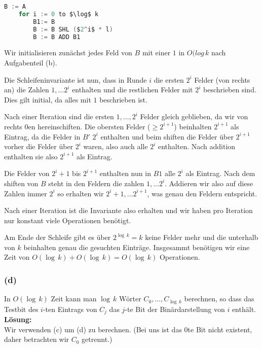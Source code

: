 \documentclass[11pt,a4paper,ngerman]{article}
\begin{document}
\begin{lstlisting}[frame=single, language=C, morekeywords={:=,SHR,SHL,NOT,XOR,AND,OR,MUL}]
	B := A
	for i := 0 to $\log$ k
		B1:= B
		B := B SHL ($2^i$ * l)
		B := B ADD B1
\end{lstlisting}

Wir initialisieren zunächst jedes Feld von $B$ mit einer $1$ in $O(log \, k$ nach Aufgabenteil (b).

Die Schleifeninvariante ist nun, dass in Runde $i$ die ersten $2^i$ Felder (von rechts an) die Zahlen $1, \ldots 2^i$ enthalten und
die restlichen Felder mit $2^i$ beschrieben sind. Dies gilt initial, da alles mit $1$ beschrieben ist.

Nach einer Iteration sind die ersten $1, \ldots, 2^i$ Felder gleich geblieben, da wir von rechts $0$en hereinschiften. Die obersten Felder ($\geq 2^{i+1}$) beinhalten $2^{i+1}$ als Eintrag, da die Felder in $B'$ $2^i$ enthalten und beim shiften die Felder über $2^{i+1}$ vorher die Felder
über $2^i$ waren, also auch alle $2^i$ enthalten. Nach addition enthalten sie also $2^{i+1}$ als Eintrag.

Die Felder von $2^i+1$ bis $2^{i+1}$ enthalten nun in $B1$ alle $2^i$ als Eintrag. Nach dem shiften von $B$ steht in den Feldern die zahlen
$1, \ldots 2^i$. Addieren wir also auf diese Zahlen immer $2^i$ so erhalten wir $2^i+1,\ldots 2^{i+1}$, was genau den Feldern entspricht.

Nach einer Iteration ist die Invariante also erhalten und wir haben pro Iteration nur konstant viele Operationen benötigt.

Am Ende der Schleife gibt es über $2^{\log \, k} = k$ keine Felder mehr und die unterhalb von $k$ beinhalten genau die gesuchten Einträge.
Insgesammt benötigen wir eine Zeit von $O(\log \, k) + O(\log \, k) = O(\log \, k)$ Operationen.

\subsubsection*{(d)}
In $O(\log \, k )$ Zeit kann man $\log \, k$ Wörter $C_0, \ldots, C_{\log \, k}$ berechnen, so dass das Testbit des $i$-ten Eintrags von $C_j$ das $j$-te Bit der Binärdarstellung von $i$ enthält.\\

\noindent\textbf{Lösung:}\\

Wir verwenden (c) um (d) zu berechnen. (Bei uns ist das $0$te Bit nicht existent, daher betrachten wir $C_0$ getrennt.)
\end{document}
